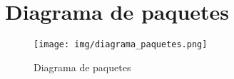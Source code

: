 \chapter{Diagrama de paquetes}

\begin{figure}[!h]
  \centering
    \texttt{[image: img/diagrama\_paquetes.png]}
    \caption{Diagrama de paquetes}
\end{figure}